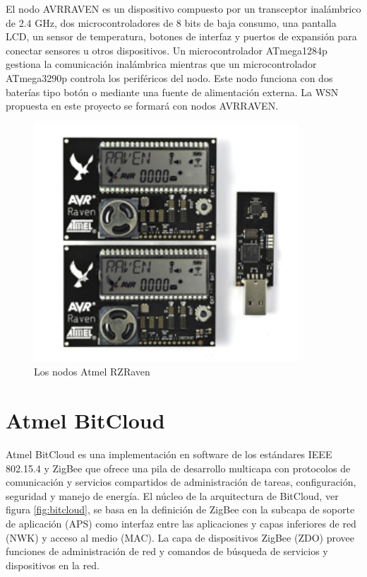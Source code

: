 El nodo AVRRAVEN es un dispositivo compuesto por un transceptor inalámbrico de 2.4 GHz, dos microcontroladores de 8 bits de baja consumo, una pantalla LCD, un sensor de temperatura, botones de interfaz y puertos de expansión para conectar sensores u otros dispositivos. Un microcontrolador ATmega1284p gestiona la comunicación inalámbrica mientras que un microcontrolador ATmega3290p controla los periféricos del nodo. Este nodo funciona con dos baterías tipo botón o mediante una fuente de alimentación externa. La WSN propuesta en este proyecto se formará con nodos AVRRAVEN.

\begin{figure}
	\centering
	\includegraphics[scale=0.9]{capitulo_2_imgs/raven.pdf}
	\caption{Los nodos Atmel RZRaven}
	\label{fig:raven}
\end{figure}

\section{Atmel BitCloud}

Atmel BitCloud\cite{atmel:bitcloud} es una implementación en software de los estándares IEEE 802.15.4 y ZigBee que ofrece una pila de desarrollo multicapa con protocolos de comunicación y servicios compartidos de administración de tareas, configuración, seguridad y manejo de energía. El núcleo de la arquitectura de BitCloud, ver figura \ref{fig:bitcloud}, se basa en la definición de ZigBee con la subcapa de soporte de aplicación (APS) como interfaz entre las aplicaciones y capas inferiores de red (NWK) y acceso al medio (MAC). La capa de dispositivos ZigBee (ZDO) provee funciones de administración de red y comandos de búsqueda de servicios y dispositivos en la red. 

